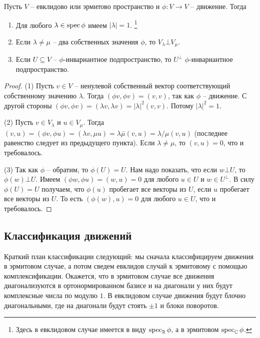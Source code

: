 \begin{claim}
\label{claim::MovmentBasicProp}
Пусть $V$ -- евклидово или эрмитово пространство и $\phi\colon V\to V$ -- движение.
Тогда
\begin{enumerate}
\item Для любого $\lambda\in \operatorname{spec} \phi$ имеем $|\lambda| = 1$.%
\footnote{Здесь в евклидовом случае имеется в виду $\operatorname{spec}_\mathbb R \phi$, а в эрмитовом $\operatorname{spec}_\mathbb C\phi$.}

\item Если $\lambda\neq \mu$ -- два собственных значения $\phi$, то $V_\lambda \bot V_\mu$.

\item Если $U\subseteq V$ -- $\phi$-инвариантное подпространство, то $U^\bot$ $\phi$-инвариантное подпространство.
\end{enumerate}
\end{claim}
\begin{proof}
(1) Пусть $v\in V$ -- ненулевой собственный вектор соответствующий собственному значению $\lambda$.
Тогда $(\phi v, \phi v) = (v, v)$, так как $\phi$ -- движение.
С другой стороны $(\phi v, \phi v) = (\lambda v, \lambda v) = |\lambda|^2(v, v)$.
Потому $|\lambda|^2 = 1$.

(2) Пусть $v\in V_\lambda$ и $u\in V_\mu$.
Тогда $(v,u) = (\phi v, \phi u) = (\lambda v,\mu u) = \lambda \bar \mu (v, u) = \lambda/\mu(v,u)$ (последнее равенство следует из предыдущего пункта).
Если $\lambda \neq \mu$, то $(v,u) = 0$, что и требовалось.

(3) Так как $\phi$ -- обратим, то $\phi(U) = U$.
Нам надо показать, что если $w\bot U$, то $\phi(w)\bot U$.
Имеем $(\phi w, \phi u) = (w, u) =0$ для любого $u\in U$ и $w\in U^\bot$.
В силу $\phi(U) = U$ получаем, что $\phi(u)$ пробегает все векторы из $U$, если $u$ пробегает все векторы из $U$.
То есть $(\phi(w), u) = 0$ для любого $u\in U$, что и требовалось.
\end{proof}

\subsection{Классификация движений}

Краткий план классификации следующий: мы сначала классифицируем движения в эрмитовом случае, а потом сведем евклидов случай к эрмитовому с помощью комплексификации.
Окажется, что в эрмитовом случае все движения диагонализуются в ортонормированном базисе и на диагонали у них будут комплексные числа по модулю $1$.
В евклидовом случае движения будут блочно диагональными, где на диагонали будут стоять $\pm1$ и блоки поворотов.

